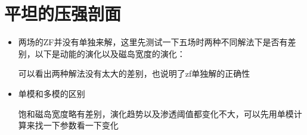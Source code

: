 \documentclass[11pt,a4paper]{article}
\begin{document}
\section{平坦的压强剖面}
\begin{itemize}	
	\item 两场的ZF并没有单独来解，这里先测试一下五场时两种不同解法下是否有差别，以下是动能的演化以及磁岛宽度的演化：
		\begin{figure}[H]
		\centering
		\caption{}		
		\end{figure}
	可以看出两种解法没有太大的差别，也说明了zf单独解的正确性
	
	\item 单模和多模的区别
		\begin{figure}[H]
		\centering
		\caption{}		
		\end{figure}
	饱和磁岛宽度略有差别，演化趋势以及渗透阈值都变化不大，可以先用单模计算来找一下参数看一下变化
	

\end{itemize}
\end{document}
